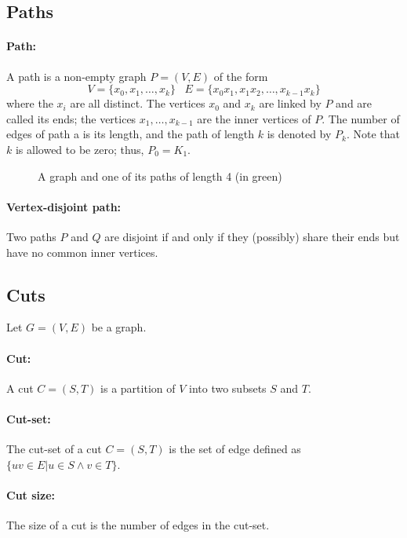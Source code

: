 \subsection{Paths}
\paragraph{Path:}\label{defPath}
A path is a non-empty graph $P = (V, E)$ of the form
$$ V = \{x_0,x_1, \dots, x_k \} \;\;\; E=\{x_0x_1, x_1x_2, \dots, x_{k-1}x_k \}$$
where the $x_i$ are all distinct. The vertices $x_0$ and $x_k$ are linked
by $P$ and are called its ends; the vertices $x_1, \dots, x_{k-1}$ are the
inner vertices of $P$. The number of edges of path a is its
length, and the path of length $k$ is denoted by $P_k$. Note that $k$ is
allowed to be zero; thus, $P_0 = K_1$.

\begin{figure}[!h]
  \caption{A graph and one of its paths of length 4 (in green)}
  \begin{center}
    
  \end{center}
\end{figure}

\paragraph{Vertex-disjoint path:}
Two paths $P$ and $Q$ are disjoint if and only if they (possibly) share their
ends but have no common inner vertices.

\subsection{Cuts}
Let $G=(V,E)$ be a graph.
\paragraph{Cut:}
A cut $C=(S,T)$ is a partition of $V$ into two subsets $S$ and $T$.

\paragraph{Cut-set:}
The cut-set of a cut $C=(S,T)$ is the set of edge defined as $\{uv \in E | u \in S \wedge v \in T\}$.

\paragraph{Cut size:}
The size of a cut is the number of edges in the cut-set.

